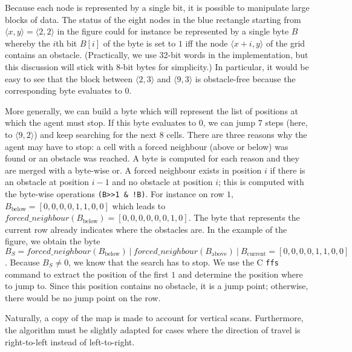 Because each node is represented by a single bit, 
it is possible to manipulate large blocks of data.  
The status of the eight nodes in the blue rectangle 
starting from $\langle x,y\rangle = \langle 2,2\rangle$ in the figure 
could for instance be represented by a single byte $B$ 
whereby the $i$th bit $B[i]$ of the byte is set to $1$ 
iff the node $\langle x+i,y\rangle$ of the grid contains an obstacle.  
(Practically, we use 32-bit words in the implementation, 
but this discussion will stick with 8-bit bytes for simplicity.)
In particular, it would be easy to see that the block 
between $\langle 2,3\rangle$ and $\langle 9,3\rangle$ 
is obstacle-free because the corresponding byte evaluates to $0$.  

More generally, we can build a byte 
which will represent the list of positions 
at which the agent must stop.  
If this byte evaluates to $0$, 
we can jump $7$ steps (here, to $\langle 9,2\rangle$) 
and keep searching for the next $8$ cells.  
There are three reasons why the agent may have to stop: 
a cell with a forced neighbour (above or below) was found 
or an obstacle was reached.  
A byte is computed for each reason 
and they are merged with a byte-wise or.  
A forced neighbour exists in position $i$ 
if there is an obstacle at position $i-1$ 
and no obstacle at position $i$; 
this is computed with the byte-wise operations \texttt{(B>>1\ \& !B)}.  
For instance on row $1$, $B_{\mathrm{below}} = [0,0,0,0,1,1,0,0]$ 
which leads to 
$\mathit{forced\_neighbour}(B_{\mathrm{below}}) = [0,0,0,0,0,0,1,0]$.  
The byte that represents the current row already indicates 
where the obstacles are.  
In the example of the figure, 
we obtain the byte $B_S = 
\mathit{forced\_neighbour}(B_{\mathrm{below}})\ |\ 
\mathit{forced\_neighbour}(B_{\mathrm{above}})\ |\ 
B_{\mathrm{current}}
= [0,0,0,0,1,1,0,0]$.  
Because $B_S \neq 0$, 
we know that the search has to stop.  
We use the C \texttt{ffs} command 
to extract the position of the first $1$ 
and determine the position where to jump to.  
Since this position contains no obstacle, 
it is a jump point; 
otherwise, there would be no jump point on the row.  

Naturally, a copy of the map is made to account for vertical scans.  
Furthermore, the algorithm must be slightly adapted 
for cases where the direction of travel is right-to-left 
instead of left-to-right.  



